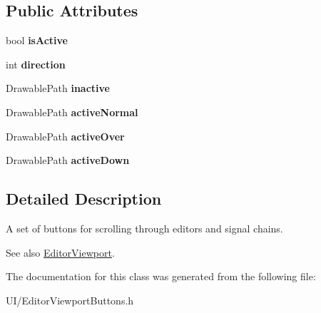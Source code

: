 \subsection*{Public Attributes}
\begin{DoxyCompactItemize}
\item 
\hypertarget{classEditorScrollButton_a1849b6801a59f08c82dfeea8be6ddd59}{bool {\bfseries is\-Active}}\label{classEditorScrollButton_a1849b6801a59f08c82dfeea8be6ddd59}

\item 
\hypertarget{classEditorScrollButton_a2002c2eb1cbb326e41b9092717b5184f}{int {\bfseries direction}}\label{classEditorScrollButton_a2002c2eb1cbb326e41b9092717b5184f}

\item 
\hypertarget{classEditorScrollButton_a961f0d5da5a2c40568f9dd1b5956337f}{Drawable\-Path {\bfseries inactive}}\label{classEditorScrollButton_a961f0d5da5a2c40568f9dd1b5956337f}

\item 
\hypertarget{classEditorScrollButton_ac5fdca798bd5d884be05b2ff30cb2987}{Drawable\-Path {\bfseries active\-Normal}}\label{classEditorScrollButton_ac5fdca798bd5d884be05b2ff30cb2987}

\item 
\hypertarget{classEditorScrollButton_a40afae70addff0710126829c90cc5b5b}{Drawable\-Path {\bfseries active\-Over}}\label{classEditorScrollButton_a40afae70addff0710126829c90cc5b5b}

\item 
\hypertarget{classEditorScrollButton_a52bdfa45eede31bc1375601a6c586bb9}{Drawable\-Path {\bfseries active\-Down}}\label{classEditorScrollButton_a52bdfa45eede31bc1375601a6c586bb9}

\end{DoxyCompactItemize}


\subsection{Detailed Description}
A set of buttons for scrolling through editors and signal chains.

\begin{DoxySeeAlso}{See also}
\hyperlink{classEditorViewport}{Editor\-Viewport}. 
\end{DoxySeeAlso}


The documentation for this class was generated from the following file\-:\begin{DoxyCompactItemize}
\item 
U\-I/Editor\-Viewport\-Buttons.\-h\end{DoxyCompactItemize}
